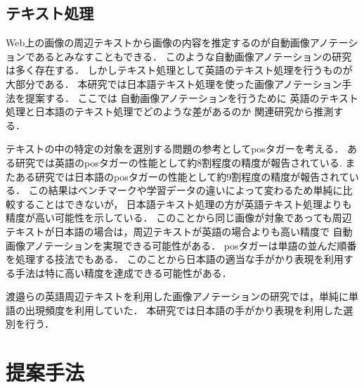 \documentclass{deimj}
\begin{document}
\subsection{テキスト処理}

Web上の画像の周辺テキストから画像の内容を推定するのが自動画像アノテーションであるとみなすこともできる．
このような自動画像アノテーションの研究は多く存在する．
しかしテキスト処理として英語のテキスト処理を行うものが大部分である．
本研究では日本語テキスト処理を使った画像アノテーション手法を提案する．
%
ここでは
自動画像アノテーションを行うために
英語のテキスト処理と日本語のテキスト処理でどのような差があるのか
関連研究から推測する．

テキストの中の特定の対象を選別する問題の参考としてposタガーを考える．
ある研究では英語のposタガーの性能として約8割程度の精度が報告されている\cite{BirdKleinLoper09}.
またある研究では日本語のposタガーの性能として約9割程度の精度が報告されている\cite{UniDicJp2010}．
この結果はベンチマークや学習データの違いによって変わるため単純に比較することはできないが，
日本語テキスト処理の方が英語テキスト処理よりも精度が高い可能性を示している．
このことから同じ画像が対象であっても周辺テキストが日本語の場合は，周辺テキストが英語の場合よりも高い精度で
自動画像アノテーションを実現できる可能性がある．
posタガーは単語の並んだ順番を処理する技法でもある．
このことから日本語の適当な手がかり表現を利用する手法は特に高い精度を達成できる可能性がある．

渡邉ら\cite{watanabe}の英語周辺テキストを利用した画像アノテーションの研究では，単純に単語の出現頻度を利用していた．
本研究では日本語の手がかり表現を利用した選別を行う．

\section{提案手法}
\label{sec:way}
\end{document}

